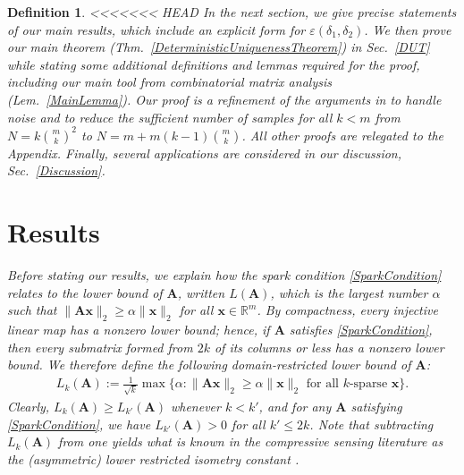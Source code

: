 \documentclass[9pt,twocolumn]{pnas-new}
\newtheorem{definition}{Definition}
\begin{document}
\begin{definition}
<<<<<<< HEAD
In the next section, we give precise statements of our main results, which include an explicit form for $\varepsilon(\delta_1, \delta_2)$. We then prove our main theorem (Thm.~\ref{DeterministicUniquenessTheorem}) in Sec.~\ref{DUT} while stating some additional definitions and lemmas required for the proof, including our main tool from combinatorial matrix analysis (Lem.~\ref{MainLemma}). Our proof is a refinement of the arguments in \cite{Hillar15} to handle noise and to reduce the sufficient number of samples for all $k < m$ from $N=k{m \choose k}^2$ to $N = m + m(k-1){m \choose k}$. All other proofs are relegated to the Appendix. Finally, several applications are considered in our discussion, Sec.~\ref{Discussion}.

\section{Results}

Before stating our results, we explain how the spark condition \eqref{SparkCondition} relates to the \emph{lower bound} \cite{Grcar10} of $\mathbf{A}$, written $L(\mathbf{A})$, which is the largest number $\alpha$ such that \mbox{$\|\mathbf{A}\mathbf{x}\|_2 \geq \alpha\|\mathbf{x}\|_2$} for all $\mathbf{x} \in \mathbb{R}^m$. By compactness, every injective linear map has a nonzero lower bound; hence, if $\mathbf{A}$ satisfies \eqref{SparkCondition}, then every submatrix formed from $2k$ of its columns or less has a nonzero lower bound. We therefore define the following domain-restricted lower bound of $\mathbf{A}$:
\begin{align*}
L_k(\mathbf{A}) := \frac{1}{\sqrt{k}}\max \{ \alpha : \|\mathbf{A}\mathbf{x}\|_2 \geq \alpha\|\mathbf{x}\|_2 \text{ for all $k$-sparse } \mathbf{x}\}.
\end{align*} 
Clearly, $L_k(\mathbf{A}) \geq L_{k'}(\mathbf{A})$ whenever $k < k'$, and for any $\mathbf{A}$ satisfying \eqref{SparkCondition}, we have $L_{k'}(\mathbf{A}) > 0$ for all $k' \leq 2k$. Note that subtracting $L_k(\mathbf{A})$ from one yields what is known in the compressive sensing literature as the (asymmetric) lower restricted isometry constant \cite{Blanchard2011, Foucart2009}. 


\end{definition}
\end{document}
